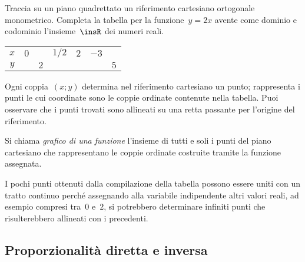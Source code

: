 \begin{exrig}
 \begin{esempio}
Traccia su un piano quadrettato un riferimento cartesiano ortogonale 
monometrico.
Completa la tabella per la funzione~$y=2x$ avente come dominio e codominio 
l'insieme~$\insR$ dei numeri reali.
\begin{center}
 \begin{tabular}{ccccccc}
 \toprule
 $x$ & $0$ && $1/2$ & $2$ & $-3$ &\\
 $y$ &&$2$&&&&$5$\\
 \bottomrule
 \end{tabular}
\end{center}
Ogni coppia~$(x;y)$ determina nel riferimento cartesiano un punto; rappresenta i 
punti le cui coordinate sono
le coppie ordinate contenute nella tabella. Puoi osservare che i punti trovati 
sono allineati su una retta passante
per l'origine del riferimento.
 \end{esempio}
\end{exrig}
\begin{definizione}
 Si chiama \emph{grafico di una funzione} l'insieme di tutti e soli i punti del 
piano cartesiano che
 rappresentano le coppie ordinate costruite tramite la funzione assegnata.
\end{definizione}
\osservazione
I pochi punti ottenuti dalla compilazione della tabella possono essere uniti con 
un tratto continuo perché
assegnando alla variabile indipendente altri valori reali, ad esempio compresi 
tra~$0$ e~$2$, si potrebbero
determinare infiniti punti che risulterebbero allineati con i precedenti.


\subsection{Proporzionalità diretta e inversa}
\label{subsec:fun_proporzionalita}

